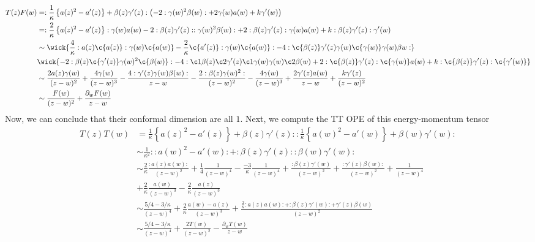 \begin{equation}
	\begin{split}
	T(z)F(w) &= : \frac{1}{\kappa} \left\{ a(z)^2 - a'(z) \right\} + \beta(z)\gamma'(z): \left(-2 : \gamma(w)^2 \beta(w): + 2 \gamma(w)a(w) + k \gamma'(w) \right)\\
	& = : \frac{2}{\kappa} \left\{a(z)^2 - a'(z) \right\}: \gamma(w) a(w) - 2 : \beta(z)\gamma'(z): : \gamma(w)^2\beta(w): + 2 : \beta(z) \gamma'(z): \gamma(w) a(w) + k :\beta(z) \gamma'(z): \gamma'(w)\\
	& \sim \wick{ \frac{4}{\kappa} : a(z) \c{a(z)}:\gamma(w) \c{a(w)} - \frac{2}{\kappa} \c{a'(z)}: \gamma(w) \c{a(w)}: - 4 :\c{\beta(z)} \gamma'(z) \gamma(w) \c{\gamma(w)} \gamma(w) \beta{w}:  }\\
	& \wick{-2: \beta(z) \c{\gamma'(z)} \gamma(w)^2 \c{\beta(w)}: - 4 : \c1{\beta(z)} \c2{\gamma'(z)} \c1{\gamma(w)} \gamma(w) \c2{\beta(w)} + 2 : \c{\beta(z)} \gamma'(z): \c{\gamma(w)} a(w) + k : \c{\beta(z)} \gamma'(z): \c{\gamma'(w)} }\\
	& \sim \frac{2a(z)\gamma(w)}{(z-w)^2} + \frac{4 \gamma(w)}{(z-w)^3} - \frac{4: \gamma'(z)\gamma(w) \beta(w):}{z-w} - \frac{2: \beta(z) \gamma(w)^2:}{(z-w)^2} - \frac{4 \gamma(w)}{(z-w)^3} + \frac{2\gamma'(z)a(w)}{z-w} + \frac{k\gamma'(z)}{(z-w)^2}\\
	& \sim \frac{F(w)}{(z-w)^2} + \frac{\partial_w F(w)}{z-w}
	\end{split}
\end{equation}
Now, we can conclude that their conformal dimension are all $1$.
Next, we compute the TT OPE of this energy-momentum tensor
\begin{equation}
	\begin{split}
	T(z)T(w) & = \frac{1}{\kappa}\left\{a(z)^2 - a'(z) \right\}+ \beta(z) \gamma'(z)::\frac{1}{\kappa} \left\{a(w)^2 -a'(w) \right\} + \beta(w) \gamma'(w):\\
	& \sim 
	\frac{1}{\kappa^2}:: a(w)^2 -a'(w): + : \beta(z)\gamma'(z):: \beta(w) \gamma'(w): \\
	& \sim \frac{2}{\kappa} \frac{:a(z)a(w):}{(z-w)^2} + \frac{1}{4} \frac{1}{(z-w)^4}  - \frac{-3}{\kappa} \frac{1}{(z-w)^4} + \frac{:\beta(z)\gamma'(w)}{(z-w)^2} + \frac{:\gamma'(z)\beta(w):}{(z-w)^2} + \frac{1}{(z-w)^4}\\
	& + \frac{2}{\kappa} \frac{a(w)}{(z-w)^3} - \frac{2}{\kappa}\frac{a(z)}{(z-w)^3}\\
	& \sim \frac{5/4 - 3/\kappa}{(z-w)^4} + \frac{2}{\kappa}\frac{a(w)-a(z)}{(z-w)^3} + \frac{\frac{2}{\kappa} : a(z)a(w): + :\beta(z)\gamma'(w): + \gamma'(z)\beta(w)}{(z-w)^2}\\
	& \sim \frac{5/4 - 3/\kappa}{(z-w)^4} + \frac{2T(w)}{(z-w)^2} - \frac{\partial_w T(w)}{z-w}
	\end{split}
\end{equation}
